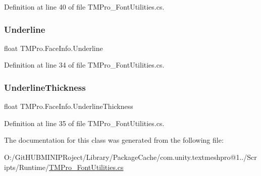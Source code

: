 Definition at line 40 of file T\+M\+Pro\+\_\+\+Font\+Utilities.\+cs.

\mbox{\label{class_t_m_pro_1_1_face_info_ac84141f34b2d75aa4bac5170c94a2970}} 
\subsubsection{\texorpdfstring{Underline}{Underline}}
{\footnotesize\ttfamily float T\+M\+Pro.\+Face\+Info.\+Underline}



Definition at line 34 of file T\+M\+Pro\+\_\+\+Font\+Utilities.\+cs.

\mbox{\label{class_t_m_pro_1_1_face_info_a0dd686bb840ba17903f59848268af48c}} 
\subsubsection{\texorpdfstring{UnderlineThickness}{UnderlineThickness}}
{\footnotesize\ttfamily float T\+M\+Pro.\+Face\+Info.\+Underline\+Thickness}



Definition at line 35 of file T\+M\+Pro\+\_\+\+Font\+Utilities.\+cs.



The documentation for this class was generated from the following file\+:\begin{DoxyCompactItemize}
\item 
O\+:/\+Git\+H\+U\+B\+M\+I\+N\+I\+P\+Roject/\+Library/\+Package\+Cache/com.\+unity.\+textmeshpro@1../\+Scripts/\+Runtime/\mbox{\hyperlink{_t_m_pro___font_utilities_8cs}{T\+M\+Pro\+\_\+\+Font\+Utilities.\+cs}}\end{DoxyCompactItemize}
